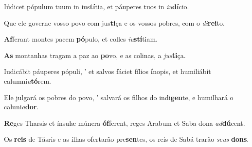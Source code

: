 \begin{greenumerate}
  \setcounter{enumi}{2}


  \item Iúdicet pópulum tuum in ius\textbf{tí}tia, {\GreStar} et páuperes tuos in \textit{iu}\textbf{dí}cio. 

  \switchcolumn\setcounter{enumi}{2}

  \item Que ele governe vosso povo com jus\textbf{ti}ça {\GreStar} e os vossos pobres, com o \textit{di}\textbf{rei}to. 

  \switchcolumn*


  \item \textbf{Af}ferant montes pacem \textbf{pó}pulo, {\GreStar} et colles \textit{iu}\textbf{stí}tiam. 

  \switchcolumn%

  \item \textbf{As} montanhas tragam a paz ao \textbf{po}vo, {\GreStar} e as colinas, a \textit{jus}\textbf{ti}ça. 

  \switchcolumn*


  \item Iudicábit páuperes pópuli, {\large'} et salvos fáciet fílios \textbf{í}no\-pis, {\GreStar} et humiliábit calumni\textit{a}\textbf{tó}rem. 

  \switchcolumn%

  \item Ele julgará os pobres do povo, {\large'} salvará os filhos do indi\textbf{gen}te, {\GreStar} e humilhará o caluni\textit{a}\textbf{dor}. 

  \switchcolumn*


  \item \textbf{Re}ges Tharsis et ínsulæ múnera \textbf{óf}ferent, {\GreStar} reges Arabum et Saba dona \textit{ad}\textbf{dú}cent. 

  \switchcolumn%

  \item Os \textbf{reis} de Tásris e as ilhas ofertarão pre\textbf{sen}tes, {\GreStar} os reis de Sabá trarão \textit{seus} \textbf{dons}. 


\end{greenumerate}

